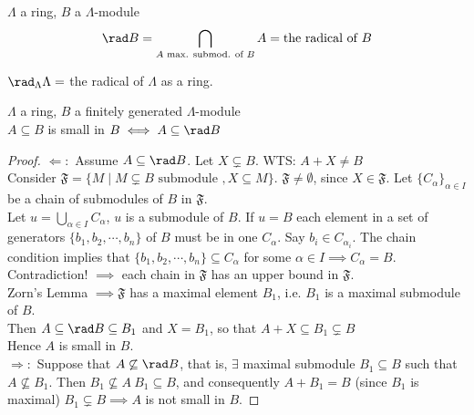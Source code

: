 \begin{defin}
$\Lambda$ a ring, $B$ a $\Lambda$-module
$$\rad B = \bigcap_{A \text{ max. submod. of }B} A = \text{the radical of }B$$
\begin{note}
$\rad_\Lambda \Lambda = $ the radical of $\Lambda$ as a ring.
\end{note}
\end{defin}

\begin{prop}
\label{prop:41.25}
$\Lambda$ a ring, $B$ a finitely generated $\Lambda$-module\\
$A \subseteq B$ is small in $B \iff A \subseteq \rad B$
\begin{proof}
$\Leftarrow :$ Assume $A \subseteq \rad B$. Let $X \subsetneq B$. WTS: $A+X \neq B$\\
Consider $\mathfrak{F} = \{ M \mid M \subsetneq B \text{ submodule }, X \subseteq M \}$. $\mathfrak{F} \neq \emptyset$, since $X \in \mathfrak{F}$. Let $\{ C_\alpha \}_{\alpha \in I}$ be a chain of submodules  of $B$ in $\mathfrak{F}$.\\ Let $u = \bigcup_{\alpha \in I} C_\alpha$, $u$ is a submodule of $B$. If $u = B$ each element in a set of generators $\{ b_1, b_2, \cdots, b_n \}$ of $B$ must be in one $C_\alpha$. Say $b_i \in C_{\alpha_i}$. The chain condition implies that $\{ b_1, b_2, \cdots, b_n \} \subseteq C_\alpha$ for some $\alpha \in I \implies C_\alpha = B$. Contradiction! $\implies$ each chain in $\mathfrak{F}$ has an upper bound in $\mathfrak{F}$.\\
Zorn's Lemma $\implies \mathfrak{F}$ has a maximal element $B_1$, i.e. $B_1$ is a maximal submodule of $B$.\\
Then $A \subseteq \rad B \subseteq B_1$ and $X=B_1$, so that $A+X \subseteq B_1 \subsetneq B$\\
Hence $A$ is small in $B$.\\
$\Rightarrow :$ Suppose that $A \not\subseteq \rad B$, that is, $\exists $ maximal submodule $B_1 \subseteq B$ such that $A \not\subseteq B_1$. Then $B_1 \not\subseteq A \ B_1 \subseteq B$, and consequently $A+B_1 = B$ (since $B_1$ is maximal) $B_1 \subsetneq B \implies A$ is not small in $B$.
\end{proof}
\end{prop}

